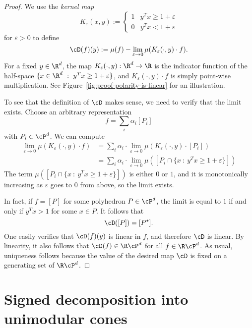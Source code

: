 \begin{proof}
  We use the \emph{kernel map}
  \[
    K_\varepsilon(x,y) := \begin{cases}
                1 & y^Tx \geq 1 + \varepsilon \\
                0 & y^Tx < 1 + \varepsilon
              \end{cases}
  \]
  for $\varepsilon > 0$ to define
  \[
    \cD(f)(y) := \mu(f) - \lim_{\varepsilon \to 0} \mu(K_\varepsilon(\cdot, y) \cdot f).
  \]
  For a fixed $y \in \R^d$,
  the map $K_\varepsilon(\cdot, y): \R^d \to \R$ is the indicator function
  of the half-space $\{ x \in \R^d ~:~ y^Tx \geq 1 + \varepsilon\}$,
  and $K_\varepsilon(\cdot, y) \cdot f$ is simply point-wise multiplication.
  See Figure~\ref{fig:proof-polarity-is-linear} for an illustration.

  To see that the definition of $\cD$ makes sense,
  we need to verify that the limit exists.
  Choose an arbitrary representation
  \[
    f = \sum_i \alpha_i [P_i]
  \]
  with $P_i \in \cP^d$.
  We can compute
  \begin{align*}
    \lim_{\varepsilon \to 0} \mu(K_\varepsilon(\cdot, y) \cdot f)
      &= \sum_i \alpha_i \cdot \lim_{\varepsilon \to 0} \mu(K_\varepsilon(\cdot, y) \cdot [P_i]) \\
      &= \sum_i \alpha_i \cdot \lim_{\varepsilon \to 0} \mu([P_i \cap \{ x ~:~ y^Tx \geq 1 + \varepsilon \}])
  \end{align*}
  The term $\mu([P_i \cap \{ x ~:~ y^Tx \geq 1 + \varepsilon \}])$ is either $0$ or $1$,
  and it is monotonically increasing as $\varepsilon$ goes to $0$ from above, so the limit exists.

  In fact, if $f = [P]$ for some polyhedron $P \in \cP^d$,
  the limit is equal to $1$ if and only if $y^Tx > 1$ for some $x \in P$.
  It follows that
  \[
    \cD([P]) = [P^\star].
  \]
  One easily verifies that $\cD(f)(y)$ is linear in $f$, and therefore $\cD$ is linear.
  By linearity, it also follows that $\cD(f) \in \R\cP^d$ for all $f \in \R\cP^d$.
  As usual, uniqueness follows because the value of the desired map $\cD$ is fixed on a generating set of $\R\cP^d$.
\end{proof}





\section{Signed decomposition into unimodular cones}

